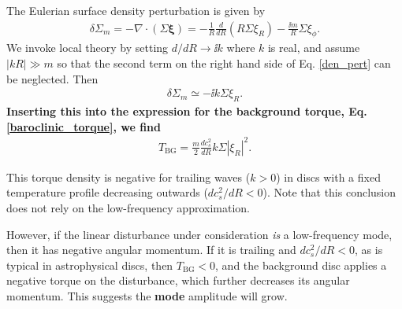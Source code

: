 The Eulerian surface density perturbation is given by
\begin{align}\label{den_pert}
  \delta\Sigma_m = -\nabla\cdot\left(\Sigma\bm{\xi}\right) 
  = -\frac{1}{R}\frac{d}{dR}\left(R\Sigma \xi_R\right) - \frac{\ii m}{R}\Sigma\xi_\phi.  
\end{align}
We invoke local theory by setting $d/dR \to \ii k$ where $k$ is
real, and assume $|kR|\gg m$ so that the second term on the right hand
side of Eq. \ref{den_pert} can be neglected. Then    
\begin{align}
  \delta\Sigma _m  \simeq -\ii k \Sigma \xi_R.
\end{align}
{\bf Inserting this into the expression for the background torque,
  Eq. \ref{baroclinic_torque}, we find}
\begin{align}
  T_\mathrm{BG} = \frac{m}{2}\frac{dc_s^2}{dR}k\Sigma |\xi_R|^2. 
\end{align}


This torque density is negative for trailing waves ($k>0$) in discs with
a fixed temperature profile decreasing outwards ($dc_s^2/dR<0$). Note
that this conclusion does not rely on the low-frequency approximation.    

However, if the linear disturbance under consideration \emph{is} a
low-frequency mode, then it has negative angular
momentum. If it is trailing and $dc_s^2/dR<0$, as is typical
in astrophysical discs, then $T_\mathrm{BG}<0$, and
the background disc applies a negative torque on the disturbance,
which further decreases its angular momentum. This suggests the {\bf
  mode} 
amplitude will grow.  

